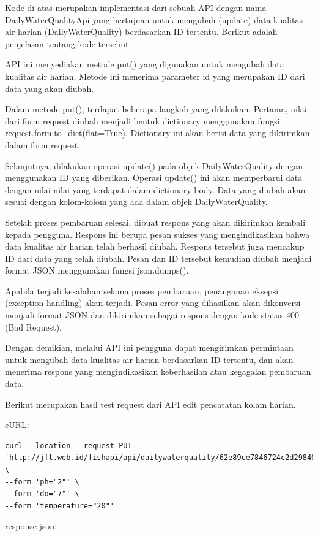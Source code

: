 \begin{enumerate}[1.]
Kode di atas merupakan implementasi dari sebuah API dengan nama DailyWaterQualityApi yang bertujuan untuk mengubah (update) data kualitas air harian (DailyWaterQuality) berdasarkan ID tertentu. Berikut adalah penjelasan tentang kode tersebut:

API ini menyediakan metode put() yang digunakan untuk mengubah data kualitas air harian. Metode ini menerima parameter id yang merupakan ID dari data yang akan diubah.

Dalam metode put(), terdapat beberapa langkah yang dilakukan. Pertama, nilai dari form request diubah menjadi bentuk dictionary menggunakan fungsi request.form.to\_dict(flat=True). Dictionary ini akan berisi data yang dikirimkan dalam form request.

Selanjutnya, dilakukan operasi update() pada objek DailyWaterQuality dengan menggunakan ID yang diberikan. Operasi update() ini akan memperbarui data dengan nilai-nilai yang terdapat dalam dictionary body. Data yang diubah akan sesuai dengan kolom-kolom yang ada dalam objek DailyWaterQuality.

Setelah proses pembaruan selesai, dibuat respons yang akan dikirimkan kembali kepada pengguna. Respons ini berupa pesan sukses yang mengindikasikan bahwa data kualitas air harian telah berhasil diubah. Respons tersebut juga mencakup ID dari data yang telah diubah. Pesan dan ID tersebut kemudian diubah menjadi format JSON menggunakan fungsi json.dumps().

Apabila terjadi kesalahan selama proses pembaruan, penanganan eksepsi (exception handling) akan terjadi. Pesan error yang dihasilkan akan dikonversi menjadi format JSON dan dikirimkan sebagai respons dengan kode status 400 (Bad Request).

Dengan demikian, melalui API ini pengguna dapat mengirimkan permintaan untuk mengubah data kualitas air harian berdasarkan ID tertentu, dan akan menerima respons yang mengindikasikan keberhasilan atau kegagalan pembaruan data.

Berikut merupakan hasil test request dari API edit pencatatan kolam harian.

cURL:

\begin{lstlisting}
curl --location --request PUT 'http://jft.web.id/fishapi/api/dailywaterquality/62e89ce7846724c2d2984687' \
--form 'ph="2"' \
--form 'do="7"' \
--form 'temperature="20"'
\end{lstlisting}

response json:


\end{enumerate}

